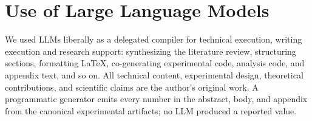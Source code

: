 \section*{Use of Large Language Models}
We used LLMs liberally as a delegated compiler for technical execution, writing execution and research
support: synthesizing the literature review, structuring sections, formatting \LaTeX{}, co-generating
experimental code, analysis code, and appendix text, and so on. All technical content, experimental design,
theoretical contributions, and scientific claims are the author's original work. A programmatic generator
emits every number in the abstract, body, and appendix from the canonical experimental artifacts; no LLM
produced a reported value.
